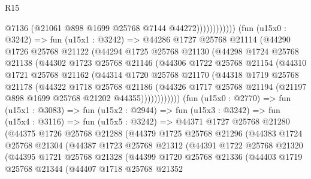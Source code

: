 \begin{lexlean}{R15}
\begin{coremodule}
                              @7136
                              (@21061 @898 @1699 @25768 @7144 @44272))))))))))))
        (fun (u15x0 : @3242) =>
        fun (u15x1 : @3242) =>
        @44286
          @1727
          @25768
          @21114
          (@44290
            @1726
            @25768
            @21122
            (@44294
              @1725
              @25768
              @21130
              (@44298
                @1724
                @25768
                @21138
                (@44302
                  @1723
                  @25768
                  @21146
                  (@44306
                    @1722
                    @25768
                    @21154
                    (@44310
                      @1721
                      @25768
                      @21162
                      (@44314
                        @1720
                        @25768
                        @21170
                        (@44318
                          @1719
                          @25768
                          @21178
                          (@44322
                            @1718
                            @25768
                            @21186
                            (@44326
                              @1717
                              @25768
                              @21194
                              (@21197 @898 @1699 @25768 @21202 @44355))))))))))))
        (fun (u15x0 : @2770) =>
        fun (u15x1 : @3083) =>
        fun (u15x2 : @2944) =>
        fun (u15x3 : @3242) =>
        fun (u15x4 : @3116) =>
        fun (u15x5 : @3242) =>
        @44371
          @1727
          @25768
          @21280
          (@44375
            @1726
            @25768
            @21288
            (@44379
              @1725
              @25768
              @21296
              (@44383
                @1724
                @25768
                @21304
                (@44387
                  @1723
                  @25768
                  @21312
                  (@44391
                    @1722
                    @25768
                    @21320
                    (@44395
                      @1721
                      @25768
                      @21328
                      (@44399
                        @1720
                        @25768
                        @21336
                        (@44403
                          @1719
                          @25768
                          @21344
                          (@44407
                            @1718
                            @25768
                            @21352

\end{coremodule}
\end{lexlean}
